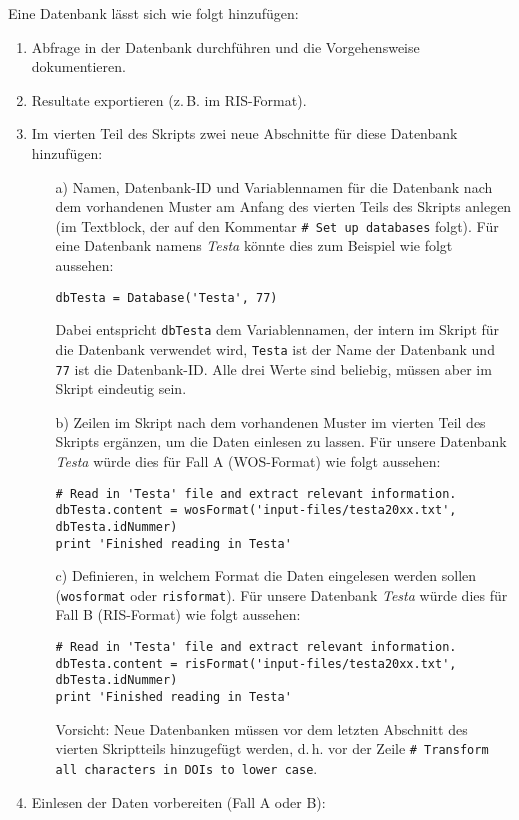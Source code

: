 Eine Datenbank lässt sich wie folgt hinzufügen:
\begin{enumerate}
\item Abfrage in der Datenbank durchführen und die Vorgehensweise dokumentieren.
\item Resultate exportieren (z.\,B. im RIS-Format).
\item Im vierten Teil des Skripts zwei neue Abschnitte für diese Datenbank hinzufügen:
\begin{itemize}
\item[a)] Namen, Datenbank-ID und Variablennamen für die Datenbank nach dem vorhandenen Muster am Anfang des vierten Teils des Skripts anlegen (im Textblock, der auf den Kommentar \texttt{\# Set up databases} folgt). Für eine Datenbank namens \textit{Testa} könnte dies zum Beispiel wie folgt aussehen: 
\begin{verbatim}
dbTesta = Database('Testa', 77)
\end{verbatim}
Dabei entspricht \texttt{dbTesta} dem Variablennamen, der intern im Skript für die Datenbank verwendet wird, \texttt{Testa} ist der Name der Datenbank und \texttt{77} ist die Datenbank-ID. Alle drei Werte sind beliebig, müssen aber im Skript eindeutig sein.
\item[b)] Zeilen im Skript nach dem vorhandenen Muster im vierten Teil des Skripts ergänzen, um die Daten einlesen zu lassen. Für unsere Datenbank \textit{Testa} würde dies für Fall A (WOS-Format) wie folgt aussehen:
\begin{verbatim}
# Read in 'Testa' file and extract relevant information.
dbTesta.content = wosFormat('input-files/testa20xx.txt', 
dbTesta.idNummer)
print 'Finished reading in Testa'
\end{verbatim}
\item[c)] Definieren, in welchem Format die Daten eingelesen werden sollen (\texttt{wosformat} oder \texttt{risformat}). Für unsere Datenbank \textit{Testa} würde dies für Fall B (RIS-Format) wie folgt aussehen:
\begin{verbatim}
# Read in 'Testa' file and extract relevant information.
dbTesta.content = risFormat('input-files/testa20xx.txt', 
dbTesta.idNummer)
print 'Finished reading in Testa'
\end{verbatim}
Vorsicht: Neue Datenbanken müssen vor dem letzten Abschnitt des vierten Skriptteils hinzugefügt werden, d.\,h. vor der Zeile \texttt{\# Transform all characters in DOIs to lower case}.
\end{itemize}
\item Einlesen der Daten vorbereiten (Fall A oder B):

\end{enumerate}
